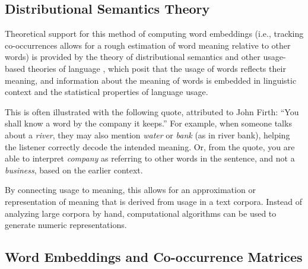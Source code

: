  
\subsection{Distributional Semantics Theory}

Theoretical support for this method of computing word embeddings (i.e., tracking co-occurrences allows for a rough estimation of word meaning relative to other words) is provided by the theory of distributional semantics \cite{harris1954distributional, firth1957synopsis} and other usage-based theories of language \cite{wittgenstein1953philosophical}, which posit that the usage of words reflects their meaning, and information about the meaning of words is embedded in linguistic context and the statistical properties of language usage.

This is often illustrated with the following quote, attributed to John Firth: ``You shall know a word by the company it keeps.'' For example, when someone talks about a \textit{river}, they may also mention \textit{water} or \textit{bank} (as in river bank), helping the listener correctly decode the intended meaning. Or, from the quote, you are able to interpret \textit{company} as referring to other words in the sentence, and not a \textit{business}, based on the earlier context.

By connecting usage to meaning, this allows for an approximation or representation of meaning that is derived from usage in a text corpora. Instead of analyzing large corpora by hand, computational algorithms can be used to generate numeric representations.

\subsection{Word Embeddings and Co-occurrence Matrices}


